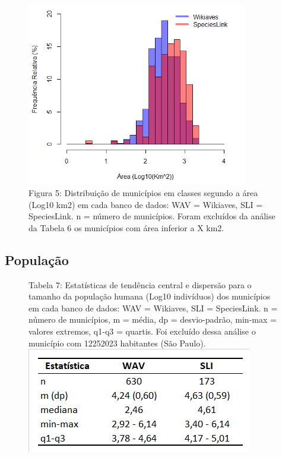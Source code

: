 \begin{figure}[h!]
\centering
\includegraphics[height = 8cm]{Imagens/H05.png}
\\{\scriptsize Figura 5: Distribuição de municípios em classes segundo a área (Log10 km2) em cada banco de dados: WAV = Wikiaves, SLI = SpeciesLink. n = número de municípios. Foram excluídos da análise da Tabela 6 os municípios com área inferior a X km2.}
\end{figure}

\newpage

\subsection{População}

\begin{figure}[h!]
\centering
{\scriptsize Tabela 7: Estatísticas de tendência central e dispersão para o tamanho da população humana (Log10 indivíduos) dos municípios em cada banco de dados: WAV = Wikiaves, SLI = SpeciesLink. n = número de municípios, m = média, dp = desvio-padrão, min-max = valores extremos, q1-q3 = quartis. Foi excluído dessa análise o município com 12252023 habitantes (São Paulo).}
\\
\includegraphics{Imagens/T07.png}
\end{figure}

